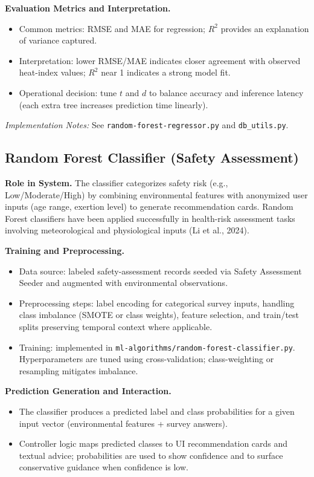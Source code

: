 \documentclass[12pt]{article}
\begin{document}
\noindent\textbf{Evaluation Metrics and Interpretation.}
\begin{itemize}
    \item Common metrics: RMSE and MAE for regression; $R^2$ provides an explanation of variance captured.
    \item Interpretation: lower RMSE/MAE indicates closer agreement with observed heat-index values; $R^2$ near 1 indicates a strong model fit.
    \item Operational decision: tune $t$ and $d$ to balance accuracy and inference latency (each extra tree increases prediction time linearly).
\end{itemize}

\noindent\textit{Implementation Notes:} See \texttt{random-forest-regressor.py} and \texttt{db\_utils.py}.

\subsection{Random Forest Classifier (Safety Assessment)}

\noindent\textbf{Role in System.} The classifier categorizes safety risk (e.g., Low/Moderate/High) by combining environmental features with anonymized user inputs (age range, exertion level) to generate recommendation cards. Random Forest classifiers have been applied successfully in health-risk assessment tasks involving meteorological and physiological inputs (Li et al., 2024).

\noindent\textbf{Training and Preprocessing.}
\begin{itemize}
    \item Data source: labeled safety-assessment records seeded via Safety Assessment Seeder and augmented with environmental observations.
    \item Preprocessing steps: label encoding for categorical survey inputs, handling class imbalance (SMOTE or class weights), feature selection, and train/test splits preserving temporal context where applicable.
    \item Training: implemented in \texttt{ml-algorithms/random-forest-classifier.py}. Hyperparameters are tuned using cross-validation; class-weighting or resampling mitigates imbalance.
\end{itemize}

\noindent\textbf{Prediction Generation and Interaction.}
\begin{itemize}
    \item The classifier produces a predicted label and class probabilities for a given input vector (environmental features + survey answers).
    \item Controller logic maps predicted classes to UI recommendation cards and textual advice; probabilities are used to show confidence and to surface conservative guidance when confidence is low.
\end{itemize}
\end{document}
